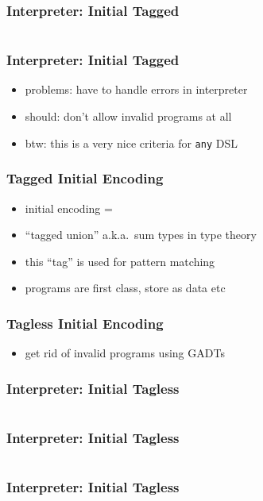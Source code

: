 \documentclass[aspectratio=169, hyperref={colorlinks, linkcolor=beamer@centricgreen}, urlcolor=links]{beamer}
\begin{document}
\begin{frame}[fragile]
  \frametitle{Interpreter: Initial Tagged}
  \inputminted[fontsize=\footnotesize]{scala}{snippets/initial-tagged-add.scala}
\end{frame}

\begin{frame}[fragile]
  \frametitle{Interpreter: Initial Tagged}
  \begin{itemize}
  \item problems: have to handle errors in interpreter
  \item should: don't allow invalid programs at all
  \item btw: this is a very nice criteria for \texttt{any} DSL
  \end{itemize}
\end{frame}

\begin{frame}
  \frametitle{Tagged Initial Encoding}
  \begin{itemize}
  \item initial encoding =
  \item ``tagged union'' a.k.a.\ sum types in type theory
  \item this ``tag'' is used for pattern matching
  \item programs are first class, store as data etc
  \end{itemize}
\end{frame}

\begin{frame}
  \frametitle{Tagless Initial Encoding}
  \begin{itemize}
  \item get rid of invalid programs using GADTs
  \end{itemize}
\end{frame}

\begin{frame}[fragile]
  \frametitle{Interpreter: Initial Tagless}
  \inputminted[fontsize=\footnotesize]{scala}{snippets/initial-tagless-expr.scala}
\end{frame}

\begin{frame}[fragile]
  \frametitle{Interpreter: Initial Tagless}
  \inputminted[fontsize=\footnotesize]{scala}{snippets/initial-tagless-sample.scala}
\end{frame}

\begin{frame}[fragile]
  \frametitle{Interpreter: Initial Tagless}
  \inputminted[fontsize=\footnotesize]{scala}{snippets/initial-tagless-interp.scala}
\end{frame}
\end{document}

